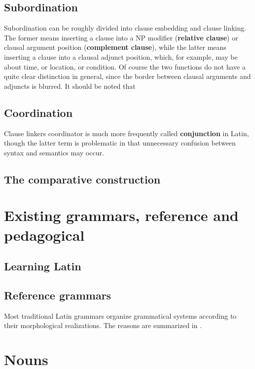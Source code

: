 \documentclass{article}
\newcommand*{\concept}[1]{\textbf{#1}}
\begin{document}
\subsection{Subordination}

Subordination can be roughly divided into clause embedding and clause linking.
The former means inserting a clause into a NP modifier (\concept{relative clause})
or clausal argument position (\concept{complement clause}),
while the latter means inserting a clause into a clausal adjunct position,
which, for example, may be about time, or location, or condition.
Of course the two functions do not have a quite clear distinction in general,
since the border between clausal arguments and adjuncts is blurred.
It should be noted that 

\subsection{Coordination}

Clause linkers coordinator is much more frequently called \concept{conjunction} in Latin,
though the latter term is problematic in that unnecessary confusion between syntax and semantics may occur.

\subsection{The comparative construction}

\section{Existing grammars, reference and pedagogical}

\subsection{Learning Latin}

\subsection{Reference grammars}

Most traditional Latin grammars organize grammatical systems according to their morphological realizations.
The reasons are summarized in .

\section{Nouns}
\end{document}
